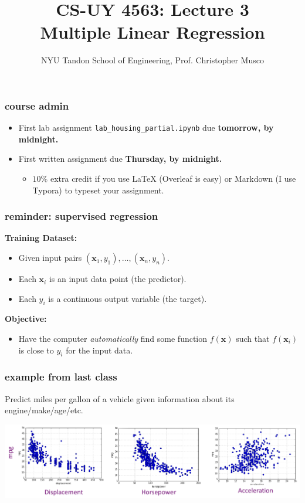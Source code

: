 \documentclass[handout,compress]{beamer}
\title{CS-UY 4563: Lecture 3 \\ Multiple Linear Regression}
\author{NYU Tandon School of Engineering, Prof. Christopher Musco}
\date{}
\newcommand{\bv}[1]{\mathbf{#1}}
\begin{document}
\begin{frame}
	\titlepage 
\end{frame}

\begin{frame}
	\frametitle{course admin}
	\begin{itemize}
		\item First lab assignment \texttt{lab\_housing\_partial.ipynb} due \textbf{tomorrow, by midnight.}
		\item First written assignment  due \textbf{Thursday, by midnight.}
		\begin{itemize}
			\item $10\%$ extra credit if you use LaTeX (Overleaf is easy) or Markdown (I use Typora) to typeset your assignment.
		\end{itemize}
	\end{itemize}
	\end{frame}


\begin{frame}
	\frametitle{reminder: supervised regression}
	\textbf{Training Dataset:}
	\begin{itemize}
		\item Given input pairs $(\bv{x}_1,y_1), \ldots, (\bv{x}_n,y_n)$.
		\item Each $\bv{x}_i$ is an input data point (the predictor).
		\item Each $y_i$ is a continuous output variable (the target).
	\end{itemize}

	\textbf{Objective:}
	\begin{itemize}
		\item Have the computer \emph{automatically} find some function $f(\bv{x})$ such that $f(\bv{x}_i)$ is close to $y_i$ for the input data.
	\end{itemize}
\end{frame}

\begin{frame}
	\frametitle{example from last class}
	Predict miles per gallon of a vehicle given information about its engine/make/age/etc.
	\begin{center}
		\includegraphics[width=\textwidth]{mpg_plots.png}
	\end{center}
\end{frame}
\end{document}
